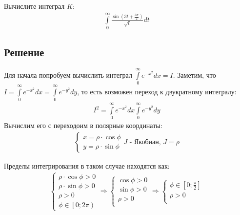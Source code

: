 \documentclass{article}
\begin{document}
Вычислите интеграл $K$:
\begin{equation*}
\begin{aligned}
\int\limits_0^{\infty} \frac{\sin(3t + \frac{3\pi}{2})}{\sqrt{t}} dt
\end{aligned}
\end{equation*}

\subsection*{Решение}

Для начала попробуем вычислить интеграл $\int\limits_0^{\infty} e^{-x^2}dx = I$. Заметим, что $I = \int\limits_0^{\infty} e^{-x^2}dx =  \int\limits_0^{\infty} e^{-y^2}dy$, то есть возможен переход к двукратному интегралу:
\begin{equation*}
\begin{aligned}
I^2 = \int\limits_0^{\infty} e^{-x^2}dx \int\limits_0^{\infty} e^{-y^2}dy
\end{aligned}
\end{equation*}
Вычислим его с переходоим в полярные координаты:
\begin{equation*}
\begin{aligned}
\begin{cases}
x = \rho \cdot \cos{\phi}\\
y= \rho \cdot \sin{\phi}
\end{cases}
J \text{ - Якобиан, } J = \rho
\end{aligned}
\end{equation*}

Пределы интегрирования в таком случае находятся как:
\begin{equation*}
\begin{aligned}
\begin{cases}
\rho \cdot \cos{\phi} > 0 \\
 \rho \cdot \sin{\phi} >0 \\
 \rho > 0 \\
  \phi \in \left[0; 2\pi\right)
\end{cases} \Rightarrow
\begin{cases}
 \cos{\phi} > 0 \\
  \sin{\phi} >0 \\
  \rho > 0 \\
\end{cases} \Rightarrow
\begin{cases}
\phi \in \left[0; \frac{\pi}{2}\right]\\
  \rho > 0 \\
  \end{cases}
\end{aligned}
\end{equation*}
\end{document}
